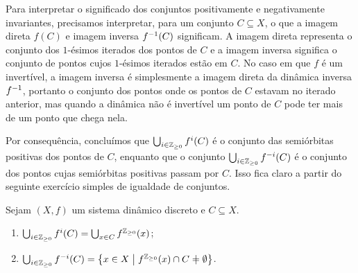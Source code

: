 Para interpretar o significado dos conjuntos positivamente e negativamente invariantes, precisamos interpretar, para um conjunto $C \subseteq X$, o que a imagem direta $f(C)$ e imagem inversa $f^{-1}(C)$ significam. A imagem direta representa o conjunto dos $1$-ésimos iterados dos pontos de $C$ e a imagem inversa significa o conjunto de pontos cujos $1$-ésimos iterados estão em $C$. No caso em que $f$ é um invertível, a imagem inversa é simplesmente a imagem direta da dinâmica inversa $f^{-1}$, portanto o conjunto dos pontos onde os pontos de $C$ estavam no iterado anterior, mas quando a dinâmica não é invertível um ponto de $C$ pode ter mais de um ponto que chega nela.

Por consequência, concluímos que $\bigcup_{i \in \mathbb{Z}_{\geq 0}} f^i(C)$ é o conjunto das semiórbitas positivas dos pontos de $C$, enquanto que o conjunto $\bigcup_{i \in \mathbb{Z}_{\geq 0}} f^{-i}(C)$ é o conjunto dos pontos cujas semiórbitas positivas passam por $C$. Isso fica claro a partir do seguinte exercício simples de igualdade de conjuntos.

\begin{exercise}
Sejam $(X,f)$ um sistema dinâmico discreto e $C \subseteq X$.
	\begin{enumerate}
	\item $\bigcup_{i \in \mathbb{Z}_{\geq 0}} f^i(C) = \bigcup_{x \in C} f^{\mathbb{Z}_{\geq 0}}(x)$;
	\item $\bigcup_{i \in \Z_{\geq 0}} f^{-i}(C) = \set{x \in X}{f^{\Z_{\geq 0}}(x) \cap C \neq \emptyset}$.
	\end{enumerate}
\end{exercise}
\begin{comment}
\begin{proof}
	\begin{enumerate}
	\item Para a primeira igualdade, basta notar que
	\begin{equation*}
	\Orb^+(C) = \bigcup_{t \in T^+} f^t(C) = \bigcup_{t \in T^+} \bigcup_{x \in C} \{f^t(x)\} = \bigcup_{x \in C} \bigcup_{t \in T^+} \{f^t(x)\} = \bigcup_{x \in C} \Orb^+(x).
	\end{equation*}

	\item Para a segunda igualdade, basta notar que
	\begin{align*}
	x \in \bigcup_{t \in T^+} f^{-t}(C) &\Leftrightarrow \exists t \in T^+\ x \in f^{-t}(C) \\
		&\Leftrightarrow \exists t \in T^+\ f^{t}(x) \in C \\
		&\Leftrightarrow \Orb^+(x) \cap C \neq \emptyset.
	\end{align*}
	\end{enumerate}
\end{proof}
\end{comment}

